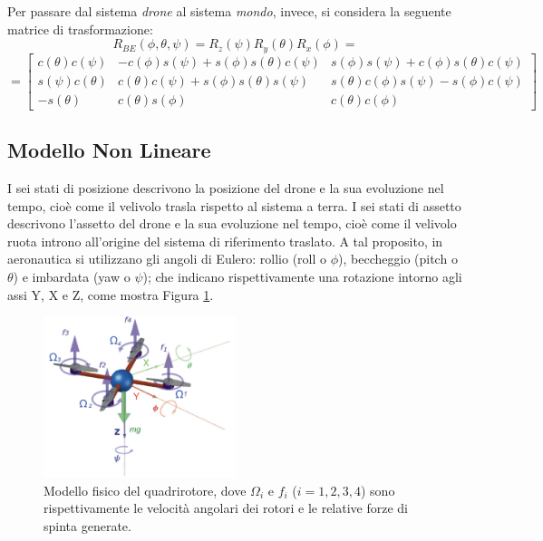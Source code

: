Per passare dal sistema \emph{drone} al sistema \emph{mondo}, invece, si considera la seguente matrice di trasformazione:
\[
R_{BE}(\phi,\theta,\psi) = 
R_z(\psi)R_y(\theta)R_x(\phi) = 
\]
\begin{equation}
=
\begin{bmatrix}
c(\theta)c(\psi) & -c(\phi)s(\psi)+s(\phi)s(\theta)c(\psi) & s(\phi)s(\psi)+c(\phi)s(\theta)c(\psi)\\
s(\psi)c(\theta) & c(\theta)c(\psi)+s(\phi)s(\theta)s(\psi) & s(\theta)c(\phi)s(\psi)-s(\phi)c(\psi)\\
-s(\theta) & c(\theta)s(\phi) & c(\theta)c(\phi)
\end{bmatrix}
\label{dcmBE}
\end{equation}

\subsection{Modello Non Lineare}

I sei stati di posizione descrivono la posizione del drone e la sua evoluzione nel tempo, cioè come il velivolo trasla rispetto al sistema a terra. I sei stati di assetto descrivono l'assetto del drone e la sua evoluzione nel tempo, cioè come il velivolo ruota introno all'origine del sistema di riferimento traslato. A tal proposito, in aeronautica si utilizzano gli angoli di Eulero: rollio (roll o $\phi$), beccheggio (pitch o $\theta$) e imbardata (yaw o $\psi$); che indicano rispettivamente una rotazione intorno agli assi Y, X e Z, come mostra Figura  \ref{fig:quadModel}.

\begin{figure}[H]
    \centering
    \includegraphics[width=0.5\textwidth]{gfx/quad_model}
    \caption[Modello fisico del quadrirotore, con velocità angolari dei rotori.]{Modello fisico del quadrirotore, dove $\Omega_i$ e $f_i $ ($i = 1,2,3,4$) sono rispettivamente le velocità angolari dei rotori e le relative forze di spinta generate.}
    \label{fig:quadModel}
\end{figure}

